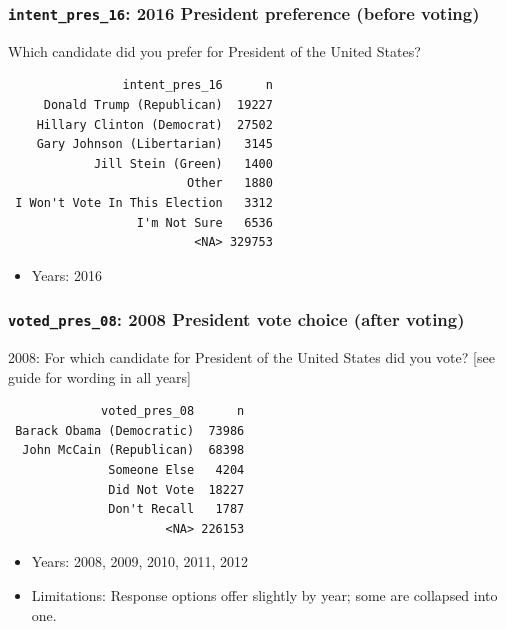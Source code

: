 \documentclass[10pt,article,oneside]{memoir}
\theoremstyle{definition}
\begin{document}
\hypertarget{intent_pres_16-2016-president-preference-before-voting}{%
\subsubsection{\texorpdfstring{\texttt{intent\_pres\_16}: 2016 President
preference (before
voting)}{intent\_pres\_16: 2016 President preference (before voting)}}\label{intent_pres_16-2016-president-preference-before-voting}}

Which candidate did you prefer for President of the United States?

\begin{verbatim}
                intent_pres_16      n
     Donald Trump (Republican)  19227
    Hillary Clinton (Democrat)  27502
    Gary Johnson (Libertarian)   3145
            Jill Stein (Green)   1400
                         Other   1880
 I Won't Vote In This Election   3312
                  I'm Not Sure   6536
                          <NA> 329753
\end{verbatim}

\begin{itemize}
\tightlist
\item
  Years: 2016
\end{itemize}

\hypertarget{voted_pres_08-2008-president-vote-choice-after-voting}{%
\subsubsection{\texorpdfstring{\texttt{voted\_pres\_08}: 2008 President
vote choice (after
voting)}{voted\_pres\_08: 2008 President vote choice (after voting)}}\label{voted_pres_08-2008-president-vote-choice-after-voting}}

2008: For which candidate for President of the United States did you
vote? {[}see guide for wording in all years{]}

\begin{verbatim}
             voted_pres_08      n
 Barack Obama (Democratic)  73986
  John McCain (Republican)  68398
              Someone Else   4204
              Did Not Vote  18227
              Don't Recall   1787
                      <NA> 226153
\end{verbatim}

\begin{itemize}
\tightlist
\item
  Years: 2008, 2009, 2010, 2011, 2012
\item
  Limitations: Response options offer slightly by year; some are
  collapsed into one.
\end{itemize}
\end{document}
